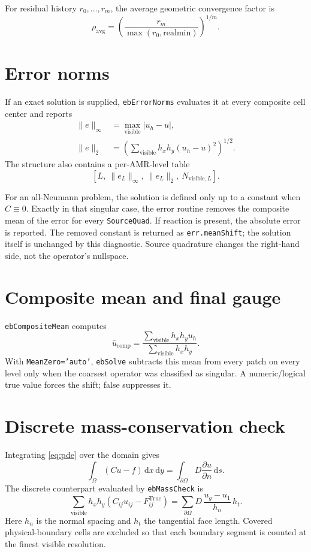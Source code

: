 \documentclass[11pt,oneside,openany]{book}
\newcommand{\code}[1]{\textnormal{\texttt{#1}}}
\newcommand{\dd}{\,\mathrm{d}}
\begin{document}
For residual history $r_0,\ldots,r_m$, the average geometric convergence factor is
\begin{equation}
 \rho_{\mathrm{avg}}=
 \left(\frac{r_m}{\max(r_0,\mathrm{realmin})}\right)^{1/m}.
 \label{eq:avgfactor}
\end{equation}

\section{Error norms}
If an exact solution is supplied, \code{ebErrorNorms} evaluates it at every composite cell center and reports
\begin{align}
 \|e\|_\infty&=\max_{\mathrm{visible}}|u_h-u|,\\
 \|e\|_2&=\left(\sum_{\mathrm{visible}}h_xh_y(u_h-u)^2\right)^{1/2}.
 \label{eq:errornorms}
\end{align}
The structure also contains a per-AMR-level table
\[
  [L,\ \|e_L\|_\infty,\ \|e_L\|_2,\ N_{\mathrm{visible},L}].
\]

For an all-Neumann problem, the solution is defined only up to a constant when $C\equiv0$. Exactly in that singular case, the error routine removes the composite mean of the error for every \code{SourceQuad}. If reaction is present, the absolute error is reported. The removed constant is returned as \code{err.meanShift}; the solution itself is unchanged by this diagnostic. Source quadrature changes the right-hand side, not the operator's nullspace.

\section{Composite mean and final gauge}
\code{ebCompositeMean} computes
\begin{equation}
 \bar u_{\mathrm{comp}}
 =\frac{\displaystyle\sum_{\mathrm{visible}}h_xh_yu_h}
        {\displaystyle\sum_{\mathrm{visible}}h_xh_y}.
 \label{eq:compmean}
\end{equation}
With \code{MeanZero='auto'}, \code{ebSolve} subtracts this mean from every patch on every level only when the coarsest operator was classified as singular. A numeric/logical true value forces the shift; false suppresses it.

\section{Discrete mass-conservation check}
Integrating \cref{eq:pde} over the domain gives
\[
 \int_\Omega(Cu-f)\dd x\dd y
 =\int_{\partial\Omega}D\frac{\partial u}{\partial n}\dd s.
\]
The discrete counterpart evaluated by \code{ebMassCheck} is
\begin{equation}
 \sum_{\mathrm{visible}}h_xh_y(C_{ij}u_{ij}-F^{\mathrm{True}}_{ij})
 =\sum_{\partial\Omega}D\,\frac{u_g-u_1}{h_n}\,h_t.
 \label{eq:massidentity}
\end{equation}
Here $h_n$ is the normal spacing and $h_t$ the tangential face length. Covered physical-boundary cells are excluded so that each boundary segment is counted at the finest visible resolution.
\end{document}
